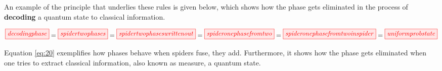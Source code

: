 \documentclass[]{article}
\begin{document}
An example of the principle that underlies these rules is given below, which shows how the phase gets eliminated in the process of \textbf{decoding} a quantum state to classical information.


\begin{equation}
\label{eq:20}
\tikzfig{decodingphase} = \tikzfig{spidertwophases} = \tikzfig{spidertwophaseswrittenout} = \tikzfig{spideronephasefromtwo} = \tikzfig{spideronephasefromtwoinspider} =
\tikzfig{uniformprobstate}
\end{equation}

Equation \eqref{eq:20} exemplifies how phases behave when spiders fuse, they add. Furthermore, it shows how the phase gets eliminated when one tries to extract classical information, also known as measure, a quantum state.

\onecolumn
\end{document}
